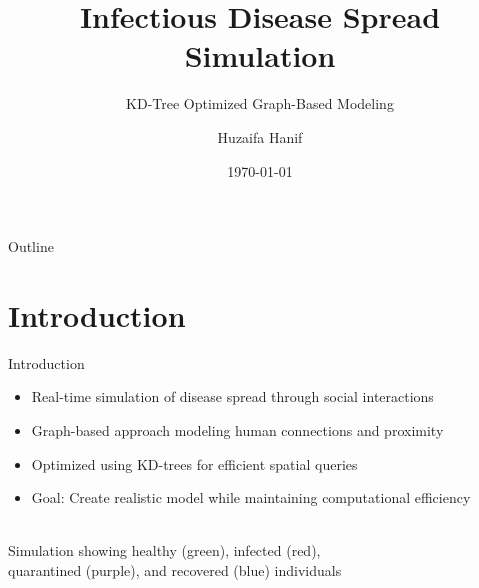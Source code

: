 \documentclass{beamer}
\title{Infectious Disease Spread Simulation}
\subtitle{KD-Tree Optimized Graph-Based Modeling}
\author{Huzaifa Hanif}
\institute{National University of Science and Technology}
\date{\today}
\begin{document}
\begin{frame}
\titlepage
\end{frame}

\begin{frame}{Outline}
\tableofcontents
\end{frame}

\section{Introduction}
\begin{frame}{Introduction}
\begin{itemize}
    \item Real-time simulation of disease spread through social interactions
    \item Graph-based approach modeling human connections and proximity
    \item Optimized using KD-trees for efficient spatial queries
    \item Goal: Create realistic model while maintaining computational efficiency
\end{itemize}

\vspace{0.5cm}
\begin{center}
    \\
    \small{Simulation showing healthy (green), infected (red),\\ quarantined (purple), and recovered (blue) individuals}
\end{center}
\end{frame}
\end{document}
